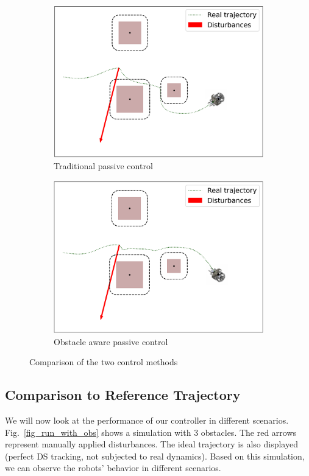\documentclass[conference]{IEEEtran}
\begin{document}
\begin{figure}
\centering
\begin{subfigure}{0.8\columnwidth}
  \centerline{\includegraphics[width=\textwidth]{figures/run_without_pass.png}}
  \caption{Traditional passive control}
\end{subfigure}
\begin{subfigure}{0.8\columnwidth}
  \centerline{\includegraphics[width=\textwidth]{figures/run_with_pass.png}}
  \caption{Obstacle aware passive control}
\end{subfigure}
\caption{Comparison of the two control methods}
\label{fig:diff_obs_pass}
\end{figure}

\subsection{Comparison to Reference Trajectory}
We will now look at the performance of our controller in different scenarios. Fig.~\ref{fig_run_with_obs} shows a simulation with 3 obstacles. The red arrows represent manually applied disturbances. The ideal trajectory is also displayed (perfect DS tracking, not subjected to real dynamics). Based on this simulation, we can observe the robots' behavior in different scenarios.
\end{document}
